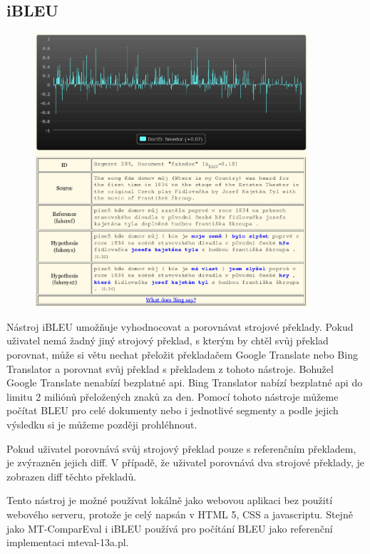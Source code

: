\subsection{iBLEU}
\begin{figure}[h]
  \center
  \includegraphics[width=0.9\textwidth]{img/ibleu.eps}
\end{figure}
Nástroj iBLEU umožňuje vyhodnocovat a porovnávat strojové překlady.
Pokud uživatel nemá žadný jiný strojový překlad,
  s kterým by chtěl svůj překlad porovnat,
  může si větu nechat přeložit překladačem Google Translate nebo Bing Translator
  a porovnat svůj překlad s překladem z tohoto nástroje.
Bohužel Google Translate nenabízí bezplatné api.
Bing Translator nabízí bezplatné api do limitu 2 miliónů přeložených znaků za den.
Pomocí tohoto nástroje můžeme počítat BLEU pro celé dokumenty nebo i jednotlivé segmenty
  a podle jejich výsledku si je můžeme později prohléhnout.

Pokud uživatel porovnává svůj strojový překlad pouze s referenčním překladem,
  je zvýrazněn jejich diff.
V případě, že uživatel porovnává dva strojové překlady,
  je zobrazen diff těchto překladů.

Tento nástroj je možné používat lokálně jako webovou aplikaci bez použití webového serveru,
  protože je celý napsán v HTML 5, CSS a javascriptu.
Stejně jako MT-ComparEval i iBLEU používá pro počítání BLEU jako referenční implementaci mteval-13a.pl.

